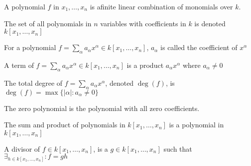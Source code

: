                 \begin{definition}
                    A polynomial $f$ in $x_1,\hdots, x_n$
                    is afinite linear combination of
                    monomials over $k$.
                \end{definition}
                \begin{notation}
                    The set of all polynomials in $n$
                    variables with coefficients in $k$ is
                    denoted $k[x_1,\hdots ,x_n]$
                \end{notation}
                \begin{definition}
                    For a polynomial
                    $f=\sum_{\alpha}%
                       a_{\alpha}x^{\alpha}%
                       \in{k}[x_1,\hdots ,x_n]$,
                    $a_\alpha$ is called the
                    coefficient of $x^{\alpha}$
                \end{definition}
                \begin{definition}
                    A term of
                    $f=\sum_{\alpha}a_{\alpha}x^{\alpha}%
                       \in k[x_1,\hdots ,x_n]$ is a product
                    $a_{\alpha}x^{\alpha}$ where
                    $a_{\alpha}\ne{0}$
                \end{definition}
                \begin{definition}
                    The total degree of
                    $f=\sum_{\alpha}a_\alpha x^\alpha$,
                    denoted $\deg(f)$, is
                    $\deg(f)=\max\{|\alpha|:a_\alpha\ne{0}\}$
                \end{definition}
                \begin{definition}
                    The zero polynomial is the
                    polynomial with all zero coefficients.
                \end{definition}
                \begin{theorem}
                    The sum and product of polynomials in
                    $k[x_1,\hdots ,x_n]$ is a polynomial
                    in $k[x_1,\hdots,x_n]$
                \end{theorem}
                \begin{definition}
                    A divisor of $f\in k[x_{1},\hdots,x_{n}]$,
                    is a $g\in k[x_{1},\hdots,x_{n}]$ such that
                    $\exists_{h\in k[x_{1},\hdots,x_{n}]}:f=gh$
                \end{definition}
